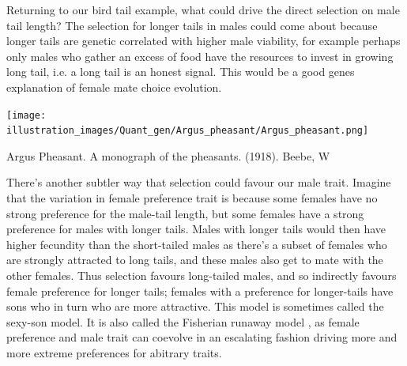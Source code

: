 Returning to our bird tail example, what could drive the direct
selection on male tail length? The selection for longer tails in males could come about because
longer tails are genetic correlated with higher male viability, for
example perhaps only males who gather an excess of food have the
resources to invest in growing long tail, i.e. a long tail is an
honest signal. This would be a good genes explanation of female mate
choice evolution.  

\begin{marginfigure}
\begin{center}
\texttt{[image: illustration\_images/Quant\_gen/Argus\_pheasant/Argus\_pheasant.png]}
\end{center}
\caption{Argus Pheasant.  A monograph of the pheasants. (1918). Beebe, W} \label{fig:argus}
\end{marginfigure}

There's another subtler way that selection could favour our male
trait. Imagine that the variation in female preference trait is
because some females have no strong preference for the male-tail
length, but some females have a strong preference for males with
longer tails. Males with longer tails would then have higher fecundity than
the short-tailed males as there's a subset of females who are strongly
attracted to long tails, and these males also get to mate with the
other females. Thus selection favours long-tailed males, and so indirectly favours
female preference for longer tails; females with a preference
for longer-tails have sons who in turn who are more attractive. This
model is sometimes called the sexy-son model. It is also called
the Fisherian runaway model \citep{fisher1915evolution}, as female
preference and male trait can coevolve in an escalating fashion
driving more and more extreme preferences for abitrary traits. 






